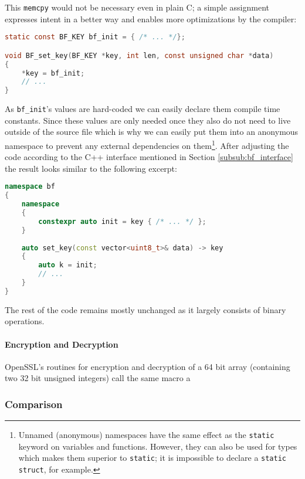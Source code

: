 This \texttt{memcpy} would not be necessary even in plain C; a simple assignment expresses intent in a better way and enables more optimizations by the compiler:

\begin{lstlisting}[language=C]
static const BF_KEY bf_init = { /* ... */};

void BF_set_key(BF_KEY *key, int len, const unsigned char *data)
{
    *key = bf_init;
    // ...
}
\end{lstlisting}

As \texttt{bf\_init}'s values are hard-coded we can easily declare them compile time constants. Since these values are only needed once they also do not need to live outside of the source file which is why we can easily put them into an anonymous namespace to prevent any external dependencies on them\footnote{Unnamed (anonymous) namespaces have the same effect as the \texttt{static} keyword on variables and functions. However, they can also be used for types which makes them superior to \texttt{static}; it is impossible to declare a \texttt{static struct}, for example.}. After adjusting the code according to the C++ interface mentioned in Section \ref{subsub:bf_interface} the result looks similar to the following excerpt:

\begin{lstlisting}[language=C++]
namespace bf
{
    namespace
    {
        constexpr auto init = key { /* ... */ };
    }
    
    auto set_key(const vector<uint8_t>& data) -> key
    {
        auto k = init;
        // ...
    }
}
\end{lstlisting}

The rest of the code remains mostly unchanged as it largely consists of binary operations.

\paragraph{Encryption and Decryption}

OpenSSL's routines for encryption and decryption of a 64 bit array (containing two 32 bit unsigned integers) call the same macro a 

\subsubsection{Comparison}